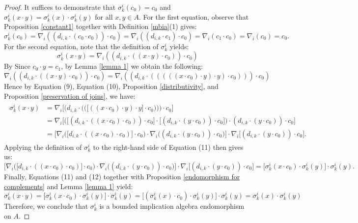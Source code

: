 \documentclass[reqno]{amsart}
\theoremstyle{plain}
\theoremstyle{definition}
\begin{document}
\begin{proof}
It suffices to demonstrate that $\sigma^i_k(c_0)=c_0$ and $\sigma^i_k(x\cdot y)=\sigma^i_k(x)\cdot\sigma^i_k(y)$ for all $x,y\in A$. For the first equation, observe that Proposition \ref{constant1} together with Definition \ref{mbia}(1) gives:
    \[\sigma^i_k(c_0)=\nabla_i((d_{i,k}\cdot(c_0\cdot c_0))\cdot c_0)=\nabla_i((d_{i,k}\cdot c_1)\cdot c_0)=\nabla_i(c_1\cdot c_0)=\nabla_i(c_0)=c_0.\] For the second equation, note that the definition of $\sigma^i_k$ yields: 
\begin{equation}
    \sigma^i_k(x\cdot y)=\nabla_i((d_{i,k}\cdot((x\cdot y)\cdot c_0))\cdot c_0)
\end{equation}
 By Since $c_0\cdot y=c_1$, by Lemma \ref{lemma 1} we obtain the following: 
 \begin{equation}
     \nabla_i((d_{i,k}\cdot((x\cdot y)\cdot c_0))\cdot c_0)=\nabla_i((d_{i,k}\cdot(((((x\cdot c_0)\cdot y)\cdot y)\cdot c_0)))\cdot c_0)
 \end{equation}
    Hence by Equation (9), Equation (10), Proposition \ref{distributivity}, and Proposition \ref{preservation of joins}, we have: 
    \begin{align}
    \begin{split}
        \sigma^i_k(x\cdot y)&=\nabla_i\biggl[\biggl(d_{i,k}\cdot\biggl(\biggl(\bigl[((x\cdot c_0)\cdot y)\cdot y\bigl]\cdot c_0\biggl)\biggl)\biggl)\cdot c_0\biggl]
        \\&=\nabla_i\biggl[\biggl(\bigl[(d_{i,k}\cdot((x\cdot c_0)\cdot c_0))\cdot c_0\bigl]\cdot\bigl[(d_{i,k}\cdot(y\cdot c_0))\cdot c_0\bigl]\biggl)\cdot(d_{i,k}\cdot(y\cdot c_0))\cdot c_0\biggl]
        \\&=\biggl[\nabla_i\biggl(\bigl[d_{i,k}\cdot((x\cdot c_0)\cdot c_0)\bigl]\cdot c_0\biggl)\cdot\nabla_i\biggl((d_{i,k}\cdot(y\cdot c_0))\cdot c_0\biggl)\biggl]\cdot\nabla_i\bigl[(d_{i,k}\cdot(y\cdot c_0))\cdot c_0\bigl].
        \end{split}
    \end{align}
    Applying the definition of $\sigma^i_k$ to the right-hand side of Equation (11) then gives us: 
    \begin{equation}
        \biggl[\nabla_i\biggl(\bigl[d_{i,k}\cdot((x\cdot c_0)\cdot c_0)\bigl]\cdot c_0\biggl)\cdot\nabla_i\biggl((d_{i,k}\cdot(y\cdot c_0))\cdot c_0\biggl)\biggl]\cdot\nabla_i\bigl[(d_{i,k}\cdot(y\cdot c_0))\cdot c_0\bigl]=\bigl[\sigma^i_k(x\cdot c_0)\cdot\sigma^i_k(y)\bigl]\cdot\sigma^i_k(y).
    \end{equation}
Finally, Equations (11) and (12) together with Proposition \ref{endomorphism for complements} and Lemma \ref{lemma 1} yield:
    \[\sigma^i_k(x\cdot y)=\bigl[\sigma^i_k(x\cdot c_0)\cdot\sigma^i_k(y)\bigl]\cdot\sigma^i_k(y)=\bigl[(\sigma^i_k(x)\cdot c_0)\cdot \sigma^i_k(y)\bigl]\cdot\sigma^i_k(y)=\sigma^i_k(x)\cdot\sigma^i_k(y)\]
    Therefore, we conclude that $\sigma^i_k$ is a bounded implication algebra endomorphism on $A$.
\end{proof}
\end{document}
